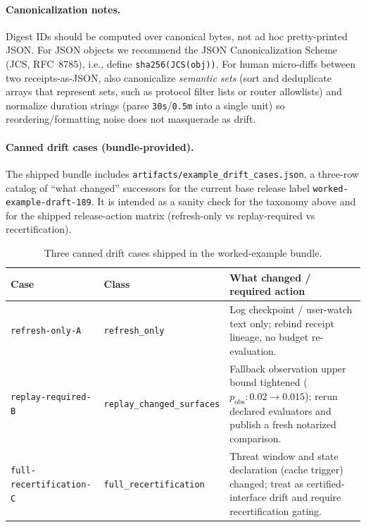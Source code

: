 \documentclass[11pt]{article}
\begin{document}
\paragraph{Canonicalization notes.}
Digest IDs should be computed over canonical bytes, not ad hoc pretty-printed JSON.
For JSON objects we recommend the JSON Canonicalization Scheme (JCS, RFC~8785), i.e., define \texttt{sha256(JCS(obj))}.\cite{rfc8785}
For human micro-diffs between two receipts-as-JSON, also canonicalize \emph{semantic sets} (sort and deduplicate arrays that represent sets, such as protocol filter lists or router allowlists) and normalize duration strings (parse \texttt{30s}/\texttt{0.5m} into a single unit) so reordering/formatting noise does not masquerade as drift.

\paragraph{Canned drift cases (bundle-provided).}
The shipped bundle includes \texttt{artifacts/example\_drift\_cases.json}, a three-row catalog of ``what changed'' successors for the current base release label \texttt{worked-example-draft-189}. It is intended as a sanity check for the taxonomy above and for the shipped release-action matrix (refresh-only vs replay-required vs recertification).
\begin{table}[t]
\centering
\begin{tabularx}{\linewidth}{@{}l l X@{}}
\toprule
Case & Class & What changed / required action \\
\midrule
\texttt{refresh-only-A} & \texttt{refresh\_only} & Log checkpoint / user-watch text only; rebind receipt lineage, no budget re-evaluation. \\
\texttt{replay-required-B} & \texttt{replay\_changed\_surfaces} & Fallback observation upper bound tightened ($p_{\mathrm{obs}}:0.02\to0.015$); rerun declared evaluators and publish a fresh notarized comparison. \\
\texttt{full-recertification-C} & \texttt{full\_recertification} & Threat window and state declaration (cache trigger) changed; treat as certified-interface drift and require recertification gating. \\
\bottomrule
\end{tabularx}
\caption{Three canned drift cases shipped in the worked-example bundle.}\label{tab:workedexample-driftcases}
\end{table}
\end{document}
